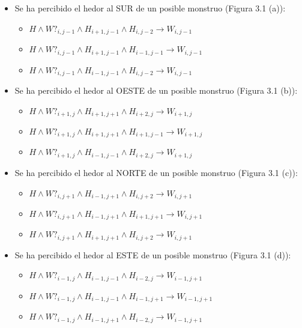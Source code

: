 \begin{itemize}
    \item Se ha percibido el hedor al SUR de un posible monstruo (Figura 3.1 (a)):
        \begin{itemize}
             \item $H \land W?_{i, j-1} \land H_{i+1, j-1} \land H_{i, j-2} \longrightarrow W_{i, j-1}$
             \item $H \land W?_{i, j-1} \land H_{i+1, j-1} \land H_{i-1, j-1} \longrightarrow W_{i, j-1}$
             \item $H \land W?_{i, j-1} \land H_{i-1, j-1} \land H_{i, j-2} \longrightarrow W_{i, j-1}$
        \end{itemize}
        
    \item Se ha percibido el hedor al OESTE de un posible monstruo (Figura 3.1 (b)):
        \begin{itemize}
            \item $H \land W?_{i+1, j} \land H_{i+1, j+1} \land H_{i+2, j} \longrightarrow W_{i+1, j}$
            \item $H \land W?_{i+1, j} \land H_{i+1, j+1} \land H_{i+1, j-1} \longrightarrow W_{i+1, j}$
            \item $H \land W?_{i+1, j} \land H_{i-1, j-1} \land H_{i+2, j} \longrightarrow W_{i+1, j}$
        \end{itemize}
        
    \item Se ha percibido el hedor al NORTE de un posible monstruo (Figura 3.1 (c)):
        \begin{itemize}
           \item $H \land W?_{i, j+1} \land H_{i-1, j+1} \land H_{i, j+2} \longrightarrow W_{i, j+1}$
            \item $H \land W?_{i, j+1} \land H_{i-1, j+1} \land H_{i+1, j+1} \longrightarrow W_{i, j+1}$
            \item $H \land W?_{i, j+1} \land H_{i+1, j+1} \land H_{i, j+2} \longrightarrow W_{i, j+1}$
        \end{itemize}
        
    \item Se ha percibido el hedor al ESTE de un posible monstruo (Figura 3.1 (d)):
        \begin{itemize}
            \item $H \land W?_{i-1, j} \land H_{i-1, j-1} \land H_{i-2, j} \longrightarrow W_{i-1, j+1}$
            \item $H \land W?_{i-1, j} \land H_{i-1, j-1} \land H_{i-1, j+1} \longrightarrow W_{i-1, j+1}$
            \item $H \land W?_{i-1, j} \land H_{i-1, j+1} \land H_{i-2, j} \longrightarrow W_{i-1, j+1}$
        \end{itemize}
\end{itemize}

